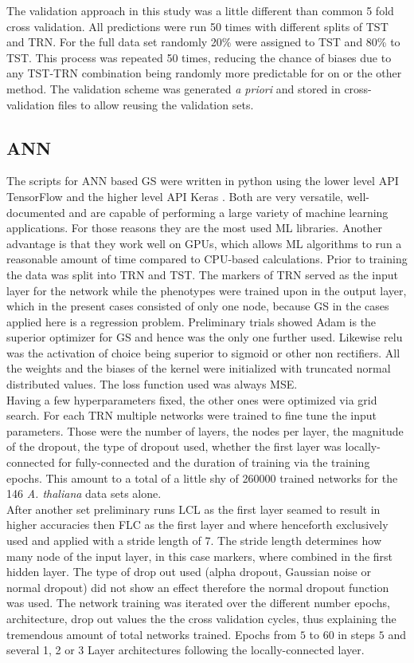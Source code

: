 The validation approach in this study was a little different than common 5 fold cross validation. All
predictions were run 50 times with different splits of TST and TRN. For the full data set randomly 20\% were
assigned to TST and 80\% to TST. This process was repeated 50 times, reducing the chance of biases due to any
TST-TRN combination being randomly more predictable for on or the other method. The validation scheme was
generated \textit{a priori} and stored in cross-validation files to allow reusing the validation sets.


\subsection{ANN}
The scripts for ANN based GS were written in python using the lower level API TensorFlow \cite{TF2016} and the
higher level API Keras \cite{keras2015}. Both are very versatile, well-documented and are capable of
performing a large variety of machine learning applications. For those reasons they are the most used ML
libraries. Another advantage is that they work well on GPUs, which allows ML algorithms to run a reasonable
amount of time compared to CPU-based calculations. Prior to training the data was split into TRN and TST. The
markers of TRN served as the input layer for the network while the phenotypes were trained upon in the output
layer, which in the present cases consisted of only one node, because GS in the cases applied here is a
regression problem. Preliminary trials showed Adam is the superior optimizer for GS and hence was the only
one further used. Likewise relu was the activation of choice being superior to sigmoid or other non
rectifiers. All the weights and the biases of the kernel were initialized with truncated normal distributed
values. The loss function used was always MSE. \\ Having a few hyperparameters fixed, the other ones
were optimized via grid search. For each TRN multiple networks were trained to fine tune the input
parameters. Those were the number of layers, the nodes per layer, the magnitude of the dropout, the type of
dropout used, whether the first layer was locally-connected for fully-connected and the duration of training
via the training epochs. This amount to a total of a little shy of 260000 trained networks for the 146
\textit{A. thaliana} data sets alone. \\ After another set preliminary runs LCL as the first layer
seamed to result in higher accuracies then FLC as the first layer and where henceforth exclusively used and
applied with a stride length of 7. The stride length determines how many node of the input layer, in this case
markers, where combined in the first hidden layer. The type of drop out used (alpha dropout, Gaussian noise
or normal dropout) did not show an effect therefore the normal dropout function was used. The network
training was iterated over the different number epochs, architecture, drop out values the the cross validation
cycles, thus explaining the tremendous amount of total networks trained. Epochs from $5$ to $60$ in steps $5$
and several 1, 2 or 3 Layer architectures following the locally-connected layer.

